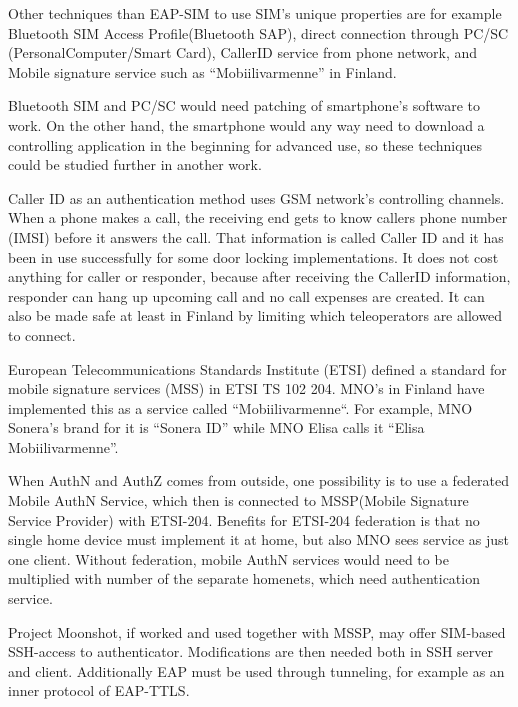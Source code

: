 \documentclass[12pt,a4paper,english]{tutthesis}
\begin{document}
Other techniques than EAP-SIM to use SIM's unique properties
are for example 
Bluetooth SIM Access Profile(Bluetooth  SAP), 
direct connection through PC/SC (Personal\-Computer/Smart\- Card),
CallerID service from phone network, and
Mobile signature service such as ``Mobiilivarmenne'' in Finland.



Bluetooth SIM and PC/SC would need patching of smartphone's software
to work.  On the other hand, the smartphone would any way need to
download  a controlling application
in the beginning for advanced use, so these techniques could be
studied further in another work.

Caller ID as an authentication method uses GSM network's controlling
channels. When a phone makes a call, the receiving end gets 
to know callers phone number (IMSI) before it answers the call.
That information is called Caller ID and it has been in use
successfully for some door locking implementations. 
It does not cost anything for caller or responder,
because after receiving the CallerID  information, responder can hang
up upcoming call and no call expenses are created.
 It can also be made safe at least in Finland
by limiting which teleoperators are allowed to connect.
















European Telecommunications Standards Institute (ETSI) defined a
standard for mobile signature services (MSS) in ETSI TS 102 204.
MNO's in Finland have implemented this as a 
service called ``Mobiilivarmenne``. 
For example, MNO Sonera's brand for  it is ``Sonera ID'' while MNO Elisa calls it
``Elisa Mobiilivarmenne''.

When AuthN and AuthZ comes from outside, one possibility is to use a
federated Mobile AuthN Service, which then is connected to MSSP(Mobile
Signature Service Provider) with ETSI-204. Benefits for ETSI-204
federation is that no single home device must implement it at home,
but also MNO sees service as just one client.  Without federation,
mobile AuthN services would need to be multiplied with number of the
separate homenets, which need authentication service.



Project Moonshot, if worked and used together with MSSP, may offer
SIM-based SSH-access to authenticator. Modifications are then needed 
both in SSH server and client. Additionally EAP must be used through
tunneling, for example as an inner protocol of EAP-TTLS. \cite{moonshot}
\end{document}
